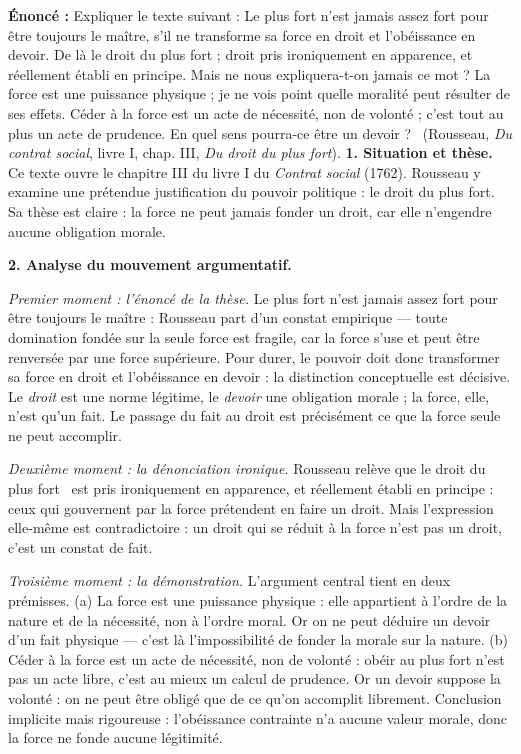 \documentclass[11pt]{article}
\newcommand{\cle}[1]{{\popxbold\color{popdark}#1}}
\begin{document}
\begin{exoresolu}
\textbf{Énoncé :} Expliquer le texte suivant : \guillemotleft Le plus fort n'est jamais assez fort pour être toujours le maître, s'il ne transforme sa force en droit et l'obéissance en devoir. De là le droit du plus fort ; droit pris ironiquement en apparence, et réellement établi en principe. Mais ne nous expliquera-t-on jamais ce mot ? La force est une puissance physique ; je ne vois point quelle moralité peut résulter de ses effets. Céder à la force est un acte de nécessité, non de volonté ; c'est tout au plus un acte de prudence. En quel sens pourra-ce être un devoir ? \guillemotright\ (Rousseau, \emph{Du contrat social}, livre I, chap. III, \emph{Du droit du plus fort}).
\tcblower
\textbf{1. Situation et thèse.} Ce texte ouvre le chapitre III du livre I du \emph{Contrat social} (1762). Rousseau y examine une prétendue justification du pouvoir politique : le \cle{droit du plus fort}. Sa thèse est claire : la force ne peut jamais fonder un droit, car elle n'engendre aucune obligation morale.

\textbf{2. Analyse du mouvement argumentatif.}

\emph{Premier moment : l'énoncé de la thèse.} \guillemotleft Le plus fort n'est jamais assez fort pour être toujours le maître \guillemotright : Rousseau part d'un constat empirique — toute domination fondée sur la seule force est fragile, car la force s'use et peut être renversée par une force supérieure. Pour durer, le pouvoir doit donc \guillemotleft transformer sa force en droit et l'obéissance en devoir \guillemotright : la distinction conceptuelle est décisive. Le \emph{droit} est une norme légitime, le \emph{devoir} une obligation morale ; la force, elle, n'est qu'un fait. Le passage du fait au droit est précisément ce que la force seule ne peut accomplir.

\emph{Deuxième moment : la dénonciation ironique.} Rousseau relève que le \guillemotleft droit du plus fort \guillemotright\ est \guillemotleft pris ironiquement en apparence, et réellement établi en principe \guillemotright : ceux qui gouvernent par la force prétendent en faire un droit. Mais l'expression elle-même est contradictoire : un droit qui se réduit à la force n'est pas un droit, c'est un constat de fait.

\emph{Troisième moment : la démonstration.} L'argument central tient en deux prémisses. (a) \guillemotleft La force est une puissance physique \guillemotright : elle appartient à l'ordre de la nature et de la nécessité, non à l'ordre moral. Or on ne peut déduire un devoir d'un fait physique — c'est là l'impossibilité de fonder la morale sur la nature. (b) \guillemotleft Céder à la force est un acte de nécessité, non de volonté \guillemotright : obéir au plus fort n'est pas un acte libre, c'est au mieux un calcul de prudence. Or un devoir suppose la volonté : on ne peut être obligé que de ce qu'on accomplit librement. Conclusion implicite mais rigoureuse : l'obéissance contrainte n'a aucune valeur morale, donc la force ne fonde aucune \cle{légitimité}.


\end{exoresolu}
\end{document}
